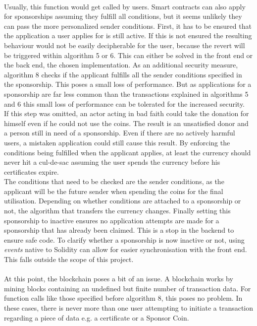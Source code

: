 \\
Usually, this function would get called by users. Smart contracts can also apply for sponsorships assuming they fulfill all conditions, but it seems unlikely they can pass the more personalized sender conditions. First, it has to be ensured that the application a user applies for is still active. If this is not ensured the resulting behaviour would not be easily decipherable for the user, because the revert will be triggered within algorithm 5 or 6. This can either be solved in the front end or the back end, the chosen implementation. As an additional security measure, algorithm 8 checks if the applicant fulfills all the sender conditions specified in the sponsorship. This poses a small loss of performance. But as applications for a sponsorship are far less common than the transactions explained in algorithms 5 and 6 this small loss of performance can be tolerated for the increased security.\\
If this step was omitted, an actor acting in bad faith could take the donation for himself even if he could not use the coins. The result is an unsatisfied donor and a person still in need of a sponsorship. Even if there are no actively harmful users, a mistaken application could still cause this result. By enforcing the conditions being fulfilled when the applicant applies, at least the currency should never hit a cul-de-sac assuming the user spends the currency before his certificates expire.\\
The conditions that need to be checked are the sender conditions, as the applicant will be the future sender when spending the coins for the final utilisation. Depending on whether conditions are attached to a sponsorship or not, the algorithm that transfers the currency changes. Finally setting this sponsorship to inactive ensures no application attempts are made for a sponsorship that has already been claimed. This is a stop in the backend to ensure safe code. To clarify whether a sponsorship is now inactive or not, using \emph{events} native to Solidity can allow for easier synchronisation with the front end. This falls outside the scope of this project.\\
\\
At this point, the blockchain poses a bit of an issue. A blockchain works by mining blocks containing an undefined but finite number of transaction data. For function calls like those specified before algorithm 8, this poses no problem. In these cases, there is never more than one user attempting to initiate a transaction regarding a piece of data e.g. a certificate or a Sponsor Coin.\\
